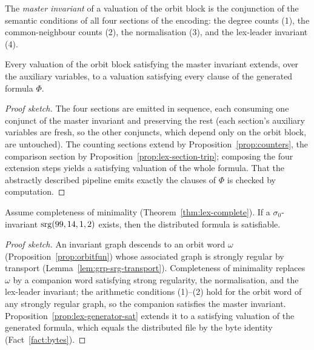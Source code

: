 \begin{definition}\label{def:lex-full-inv}
The \emph{master invariant} of a valuation of the orbit block is the
conjunction of the semantic conditions of all four sections of the
encoding: the degree counts (1), the common-neighbour counts (2), the
normalisation (3), and the lex-leader invariant (4).
\leanok
{}
\end{definition}

\begin{proposition}\label{prop:lex-generator-sat}
Every valuation of the orbit block satisfying the master invariant extends,
over the auxiliary variables, to a valuation satisfying every clause of the
generated formula $\Phi$.
\leanok
{}
\end{proposition}

\begin{proof}[Proof sketch]
The four sections are emitted in sequence, each consuming one conjunct of
the master invariant and preserving the rest (each section's auxiliary
variables are fresh, so the other conjuncts, which depend only on the orbit
block, are untouched).  The counting sections extend by
Proposition~\ref{prop:counters}, the comparison section by
Proposition~\ref{prop:lex-section-trip}; composing the four extension steps
yields a satisfying valuation of the whole formula.  That the abstractly
described pipeline emits exactly the clauses of $\Phi$ is checked by
computation.
\end{proof}

\begin{lemma}\label{lem:lex-encodes}
Assume completeness of minimality
(Theorem~\ref{thm:lex-complete}).  If a $\sigma_0$-invariant
$\mathrm{srg}(99,14,1,2)$ exists, then the distributed formula is satisfiable.
\leanok
{}
\end{lemma}

\begin{proof}[Proof sketch]
An invariant graph descends to an orbit word $\omega$
(Proposition~\ref{prop:orbitfun}) whose associated graph is strongly
regular by transport (Lemma~\ref{lem:grp-srg-transport}).  Completeness
of minimality replaces $\omega$ by a companion word satisfying strong
regularity, the normalisation, and the lex-leader invariant; the arithmetic
conditions (1)--(2) hold for the orbit word of any strongly regular graph,
so the companion satisfies the master invariant.
Proposition~\ref{prop:lex-generator-sat} extends it to a satisfying
valuation of the generated formula, which equals the distributed file by the
byte identity (Fact~\ref{fact:bytes}).
\end{proof}

